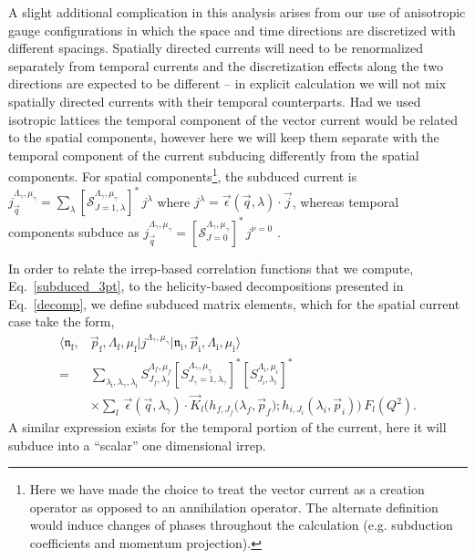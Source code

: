 \documentclass[twocolumn,amsmath,amssymb,prd,10pt,floatfix, 
superscriptaddress,nofootinbib, showpacs, preprintnumbers]{revtex4-1}
\begin{document}
A slight additional complication in this analysis arises from our use of anisotropic gauge configurations in which the space and time directions are discretized with different spacings. Spatially directed currents will need to be renormalized separately from temporal currents and the discretization effects along the two directions are expected to be different -- in explicit calculation we will not mix spatially directed currents with their temporal counterparts. Had we used isotropic lattices the temporal component of the vector current would be related to the spatial components, however here we will keep them separate with the temporal component of the current subducing differently from the spatial components. For spatial components\footnote{Here we have made the choice to treat the vector current as a creation operator as opposed to an annihilation operator. The alternate definition would induce changes of phases throughout the calculation (e.g. subduction coefficients and momentum projection).}, the subduced current is ${j_{\vec{q}}^{\Lambda_\gamma, \mu_\gamma} = \sum_\lambda \left[ \mathcal{S}^{\Lambda_\gamma, \mu_\gamma}_{J=1,\lambda} \right]^* \, j^\lambda}$ where ${j^\lambda = \vec{\epsilon}(\vec{q}, \lambda) \cdot \vec{j}}$, whereas temporal components subduce as ${j_{\vec{q}}^{\Lambda_\gamma, \mu_\gamma} = \left[ \mathcal{S}^{\Lambda_\gamma, \mu_\gamma}_{J=0}\right]^* \, j^{\nu=0}}$ . 


In order to relate the irrep-based correlation functions that we compute, Eq.~\ref{subduced_3pt}, to the helicity-based decompositions presented in Eq.~\ref{decomp}, we define subduced matrix elements, which for the spatial current case take the form,
\begin{align}
\big\langle  \mathfrak{n}_\mathrm{f}, &\vec{p}_\mathrm{f}, \Lambda_\mathrm{f}, \mu_\mathrm{f} \big| j^{\Lambda_\gamma, \mu_\gamma} \big| \mathfrak{n}_\mathrm{i}, \vec{p}_\mathrm{i}, \Lambda_\mathrm{i}, \mu_\mathrm{i} \big\rangle  \nonumber \\
	= &\sum_{\lambda_\mathrm{i}, \lambda_\gamma, \lambda_\mathrm{i}} S^{\Lambda_f, \mu_f}_{J_f,\lambda_f}  \left[S^{\Lambda_\gamma ,\mu_\gamma}_{J_\gamma =1 ,\lambda_\gamma} \right]^* \left[S^{\Lambda_i ,\mu_i}_{J_i,\lambda_i}\right]^*  \label{eqn::subduced_decomp} \\
	 &\times \sum\nolimits_l \, \vec{\epsilon}(\vec{q},\lambda_\gamma) \cdot \vec{K}_l\big(h_{f,J_f}\big(\lambda_f,\vec{p}_f); h_{i,J_i}(\lambda_i,\vec{p}_i) \big) \, F_l(Q^2). \nonumber
\end{align}
A similar expression exists for the temporal portion of the current, here it will subduce into a ``scalar'' one dimensional irrep.  
\end{document}
